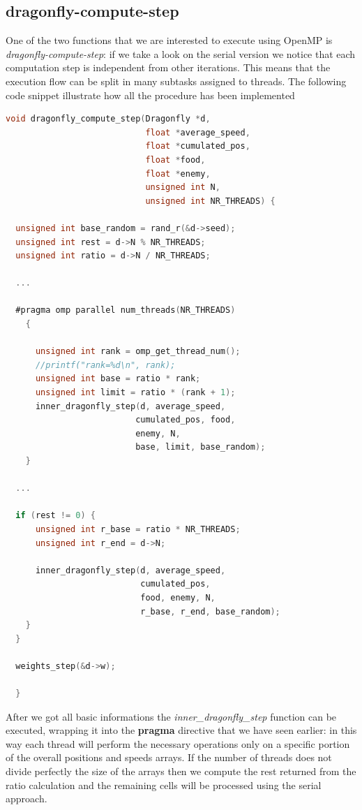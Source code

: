\documentclass[10pt]{article}
\begin{document}
\begin{multicols}{2}
\subsection*{dragonfly-compute-step}

One of the two functions that we are interested to execute using OpenMP is \textit{dragonfly-compute-step}:
if we take a look on the serial version we notice that each computation step is independent
from other iterations. This means that the execution flow can be split in many subtasks assigned
to threads. The following code snippet illustrate how all the procedure has been implemented

\begin{lstlisting}[language=C,caption={parallelized dragonfly-compute-step}]
void dragonfly_compute_step(Dragonfly *d, 
                            float *average_speed,
                            float *cumulated_pos, 
                            float *food, 
                            float *enemy, 
                            unsigned int N, 
                            unsigned int NR_THREADS) {

  unsigned int base_random = rand_r(&d->seed);
  unsigned int rest = d->N % NR_THREADS;
  unsigned int ratio = d->N / NR_THREADS;

  ...

  #pragma omp parallel num_threads(NR_THREADS)
    {
      
      unsigned int rank = omp_get_thread_num();
      //printf("rank=%d\n", rank);
      unsigned int base = ratio * rank;
      unsigned int limit = ratio * (rank + 1);
      inner_dragonfly_step(d, average_speed, 
                          cumulated_pos, food, 
                          enemy, N,
                          base, limit, base_random);
    }
  
  ...

  if (rest != 0) {
      unsigned int r_base = ratio * NR_THREADS;
      unsigned int r_end = d->N;

      inner_dragonfly_step(d, average_speed, 
                           cumulated_pos, 
                           food, enemy, N,
                           r_base, r_end, base_random);
    }
  }

  weights_step(&d->w);
  
  }

\end{lstlisting}


\noindent After we got all basic informations the \textit{inner\_dragonfly\_step}
function can be executed, wrapping it into the \textbf{pragma} directive that we have seen earlier: in this way each thread will 
perform the necessary operations only on a specific portion of the overall positions and speeds arrays.
If the number of threads does not divide perfectly the size of the arrays then we compute the rest
returned from the ratio calculation and the remaining cells will be processed using the serial approach.


\end{multicols}
\end{document}
